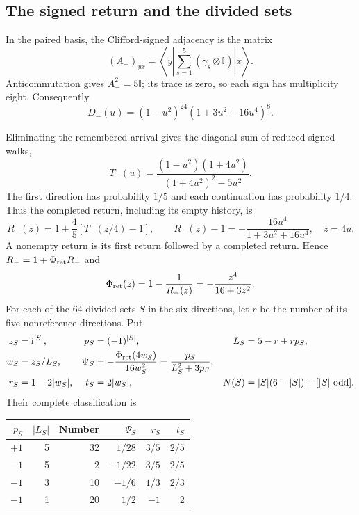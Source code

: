 \documentclass[aps,prx,onecolumn,10pt,notitlepage,nofootinbib,longbibliography]{revtex4-2}
\numberwithin{equation}{section}
\numberwithin{table}{section}
\newcommand{\Id}{\mathbb I}
\newcommand{\ii}{\mathrm i}
\newcommand{\Phis}{\Phi_{\rm ret}}
\begin{document}
\subsection{The signed return and the divided sets}
\label{sec:signedreturn}
In the paired basis, the Clifford-signed adjacency is the matrix
\begin{equation}
 (A_-)_{yx}=\left\langle y\left|\sum_{s=1}^5(\gamma_s\otimes\Id)\right|x\right\rangle.
 \label{eq:signedadjacencydefinition}
\end{equation}
Anticommutation gives $A_-^2=5\Id$; its trace is zero, so each sign has multiplicity eight. Consequently
\begin{equation}
 D_-(u)=(1-u^2)^{24}(1+3u^2+16u^4)^8.
 \label{eq:signeddet}
\end{equation}


Eliminating the remembered arrival gives the diagonal sum of reduced signed walks,
\begin{equation}
 T_-(u)=\frac{(1-u^2)(1+4u^2)}{(1+4u^2)^2-5u^2}.
\end{equation}
The first direction has probability $1/5$ and each continuation has probability $1/4$. Thus the completed return, including its empty history, is
\begin{equation}
 R_-(z)=1+\frac45[T_-(z/4)-1],\qquad
 R_-(z)-1=-\frac{16u^4}{1+3u^2+16u^4},\quad z=4u.
\end{equation}
A nonempty return is its first return followed by a completed return. Hence $R_-=1+\Phis R_-$ and
\begin{equation}
 \Phis(z)=1-\frac1{R_-(z)}=-\frac{z^4}{16+3z^2}.
 \label{eq:signedrenewal}
\end{equation}
For each of the 64 divided sets $S$ in the six directions, let $r$ be the number of its five nonreference directions. Put
\begin{align}
 z_S&=\ii^{|S|},&p_S&=(-1)^{|S|},&L_S&=5-r+rp_S,\notag\\
 w_S&=z_S/L_S,&
 \Psi_S&=-\frac{\Phis(4w_S)}{16w_S^2}
 =\frac{p_S}{L_S^2+3p_S},\notag\\
 r_S&=1-2|w_S|,&t_S&=2|w_S|,&
 N(S)&=|S|(6-|S|)+[|S|\text{ odd}].
 \label{eq:support}
\end{align}
Their complete classification is
\label{sec:supportclassification}
\begin{center}
\begin{tabular}{rrrrrr}
\toprule
$p_S$&$|L_S|$&Number&$\Psi_S$&$r_S$&$t_S$\\\midrule
$+1$&5&32&$1/28$&$3/5$&$2/5$\\
$-1$&5&2&$-1/22$&$3/5$&$2/5$\\
$-1$&3&10&$-1/6$&$1/3$&$2/3$\\
$-1$&1&20&$1/2$&$-1$&2\\\bottomrule
\end{tabular}
\end{center}
\end{document}
